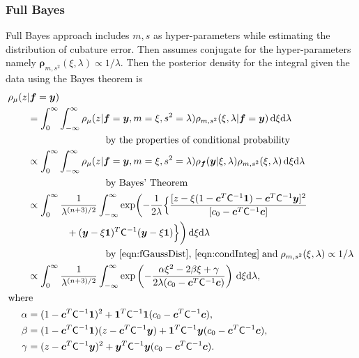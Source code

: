 \documentclass[smallextended]{svjour3}       %
\newcommand{\bm}[1]{\boldsymbol{#1}}
\newcommand{\D}[1]{\text{d}{#1}}
\newcommand{\vc}{\bm{c}}
\newcommand{\vf}{\bm{f}}
\newcommand{\vrho}{\bm{\rho}}
\newcommand{\vy}{\bm{y}}
\newcommand{\vone}{\bm{1}}
\newcommand{\mC}{\mathsf{C}}
\begin{document}
\subsubsection{Full Bayes}

Full Bayes approach includes $m, s$ as hyper-parameters
 while estimating the distribution of cubature error. Then assumes conjugate for the hyper-parameters namely $\vrho_{m,s^2}(\xi, \lambda) \propto 1/\lambda$. Then the posterior density for the integral given the data using the Bayes theorem is
\begin{align*}
\MoveEqLeft{\rho_{\mu}(z | \vf = \vy)} \\
& = \int_{0}^\infty \int_{-\infty}^\infty \rho_{\mu}(z | \vf = \vy, m = \xi, s^2 = \lambda) \rho_{m, s^2}(\xi, \lambda | \vf = \vy ) \, \D \xi \D \lambda \\
&\qquad \qquad \qquad \qquad \text{by the properties of conditional probability} \\
& \propto \int_{0}^\infty \int_{-\infty}^\infty \rho_{\mu}(z | \vf = \vy, m = \xi, s^2 = \lambda)  \rho_{\vf}(\vy | \xi, \lambda ) \rho_{m, s^2}(\xi, \lambda) \, \D \xi \D \lambda \\
&\qquad \qquad \qquad \qquad \text{by Bayes' Theorem} \\
& \propto \displaystyle \int_{0}^\infty  \frac{1}{\lambda^{(n+3)/2}} \int_{-\infty}^\infty  \exp \biggl( -\frac{1}{2\lambda}\Bigl\{
\frac{
[z - \xi (1 - \vc^T \mC^{-1} \vone)  -  \vc^T \mC^{-1} \vy]^2}
{[c_0  -\vc ^T \mC^{-1} \vc]}  \\
& \qquad \qquad  + (\vy - \xi \vone)^T \mC^{-1}(\vy - \xi \vone) \Bigr \} \biggr) \, \D \xi \D \lambda \\
&\qquad \qquad \qquad \qquad  
\text{by \eqref{eqn:fGaussDist}, \eqref{eqn:condInteg}} \; \text{and} \; \rho_{m,s^2}(\xi,\lambda) \propto 1/\lambda \\
& \propto \displaystyle \int_{0}^\infty  \frac{1}{\lambda^{(n+3)/2}} \int_{-\infty}^\infty  \exp\left( -\frac{\alpha \xi^2 -2 \beta \xi + \gamma}{2\lambda(c_0  -\vc ^T \mC^{-1} \vc)} \right) \, \D \xi \D \lambda, \\
\intertext{where}
\alpha & = (1 - \vc^T \mC^{-1} \vone)^2 + \vone^T \mC^{-1} \vone (c_0  -\vc ^T \mC^{-1} \vc),\\
\beta & =(1 - \vc^T \mC^{-1} \vone)(z - \vc^T \mC^{-1} \vy )  + \vone^T \mC^{-1} \vy (c_0  -\vc ^T \mC^{-1} \vc),\\
\gamma &  = (z - \vc^T \mC^{-1} \vy )^2  + \vy^T \mC^{-1} \vy (c_0  -\vc ^T \mC^{-1} \vc).
\end{align*}
\end{document}
